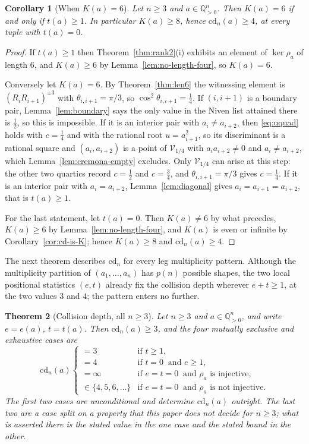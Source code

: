 \documentclass[11pt,a4paper]{article}
\newcommand{\Q}{\mathbb{Q}}
\newcommand{\cd}{\mathrm{cd}}
\newtheorem{theorem}{Theorem}
\newtheorem{corollary}[theorem]{Corollary}
\theoremstyle{definition}
\theoremstyle{remark}
\theoremstyle{plain}
\begin{document}
\begin{corollary}[When $K(a)=6$]\label{cor:K-eq-six}
Let $n\ge3$ and $a\in\Q_{>0}^n$. Then $K(a)=6$ if and only if $t(a)\ge1$. In particular
$K(a)\ge8$, hence $\cd_n(a)\ge4$, at every tuple with $t(a)=0$.
\end{corollary}

\begin{proof}
If $t(a)\ge1$ then Theorem~\ref{thm:rank2}(i) exhibits an element of $\ker\rho_a$ of length $6$,
and $K(a)\ge6$ by Lemma~\ref{lem:no-length-four}, so $K(a)=6$.

Conversely let $K(a)=6$. By Theorem~\ref{thm:len6} the witnessing element is
$(R_iR_{i+1})^{\pm3}$ with $\theta_{i,i+1}=\pi/3$, so $\cos^2\theta_{i,i+1}=\tfrac14$. If
$(i,i+1)$ is a boundary pair, Lemma~\ref{lem:boundary} says the only value in the Niven list
attained there is $\tfrac12$, so this is impossible. If it is an interior pair with
$a_i\ne a_{i+2}$, then \eqref{eq:uquad} holds with $c=\tfrac14$ and with the rational root
$u=a_{i+1}^2$, so its discriminant is a rational square and $(a_i,a_{i+2})$ is a point of
$\mathcal{V}_{1/4}$ with $a_ia_{i+2}\ne0$ and $a_i\ne a_{i+2}$, which
Lemma~\ref{lem:cremona-empty} excludes. Only $\mathcal{V}_{1/4}$ can arise at this step: the
other two quartics record $c=\tfrac12$ and $c=\tfrac34$, and $\theta_{i,i+1}=\pi/3$ gives
$c=\tfrac14$. If it is an interior pair with $a_i=a_{i+2}$, Lemma~\ref{lem:diagonal} gives
$a_i=a_{i+1}=a_{i+2}$, that is $t(a)\ge1$.

For the last statement, let $t(a)=0$. Then $K(a)\ne6$ by what precedes, $K(a)\ge6$ by
Lemma~\ref{lem:no-length-four}, and $K(a)$ is even or infinite by
Corollary~\ref{cor:cd-is-K}; hence $K(a)\ge8$ and $\cd_n(a)\ge4$.
\end{proof}

The next theorem describes $\cd_n$ for every leg multiplicity pattern. Although the
multiplicity partition of $(a_1,\dots,a_n)$ has $p(n)$ possible shapes, the two local
positional statistics $(e,t)$ already fix the collision depth wherever $e+t\ge1$, at the two
values $3$ and $4$; the pattern enters no further.

\begin{theorem}[Collision depth, all $n\ge3$]\label{thm:cd-general}
Let $n\ge3$ and $a\in\Q_{>0}^n$, and write $e=e(a)$, $t=t(a)$. Then $\cd_n(a)\ge3$, and the
four mutually exclusive and exhaustive cases are
\[
\cd_n(a)
\begin{cases}
=3      & \text{if }t\ge1,\\
=4      & \text{if }t=0\ \text{ and }e\ge1,\\
=\infty & \text{if }e=t=0\ \text{ and }\rho_a\text{ is injective},\\
\in\{4,5,6,\dots\} & \text{if }e=t=0\ \text{ and }\rho_a\text{ is not injective}.
\end{cases}
\]
The first two cases are unconditional and determine $\cd_n(a)$ outright. The last two are a
case split on a property that this paper does not decide for $n\ge3$; what is asserted there is
the stated value in the one case and the stated bound in the other.
\end{theorem}
\end{document}
